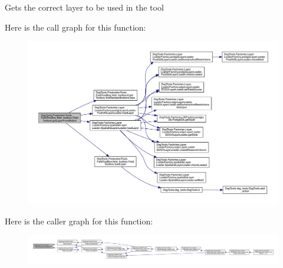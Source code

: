 \begin{DoxyVerb}Gets the correct layer to be used in the tool
\end{DoxyVerb}
 Here is the call graph for this function\+:
\nopagebreak
\begin{figure}[H]
\begin{center}
\leavevmode
\includegraphics[width=350pt]{class_dsg_tools_1_1_production_tools_1_1_field_tool_box_1_1field__toolbox_1_1_field_toolbox_a4f022107f1891fb44f5f5b25bc4e426a_cgraph}
\end{center}
\end{figure}
Here is the caller graph for this function\+:
\nopagebreak
\begin{figure}[H]
\begin{center}
\leavevmode
\includegraphics[width=350pt]{class_dsg_tools_1_1_production_tools_1_1_field_tool_box_1_1field__toolbox_1_1_field_toolbox_a4f022107f1891fb44f5f5b25bc4e426a_icgraph}
\end{center}
\end{figure}
\mbox{\label{class_dsg_tools_1_1_production_tools_1_1_field_tool_box_1_1field__toolbox_1_1_field_toolbox_a8a4fc2d32d5aa1acf49e0cd15a4eedfc}} 
